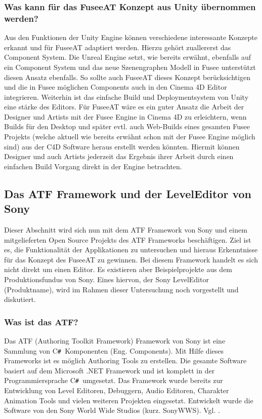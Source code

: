 \documentclass[pagesize, paper=a4, fontsize=12pt, titlepage=true, headings=small, headnosepline, abstractoff, liststotoc, nochapterprefix, plainheadsepline, twoside]{scrreprt}
\newcommand{\CSS}{C\texttt{\# }}
\begin{document}
\subsubsection{Was kann für das FuseeAT Konzept aus Unity übernommen werden?}
Aus den Funktionen der Unity Engine können verschiedene interessante Konzepte erkannt und für FuseeAT adaptiert werden. Hierzu gehört zuallererst das Component System. Die Unreal Engine setzt, wie bereits erwähnt, ebenfalls auf ein Component System und das neue Szenengraphen Modell in Fusee unterstützt diesen Ansatz ebenfalls. So sollte auch FuseeAT dieses Konzept berücksichtigen und die in Fusee möglichen Components auch in den Cinema 4D Editor integrieren. Weiterhin ist das einfache Build und Deploymentsystem von Unity eine stärke des Editors. Für FuseeAT wäre es ein guter Ansatz die Arbeit der Designer und Artists mit der Fusee Engine in Cinema 4D zu erleichtern, wenn Builds für den Desktop und später evtl. auch Web-Builds eines gesamten Fusee Projekts (welche aktuell wie bereits erwähnt schon mit der Fusee Engine möglich sind) aus der C4D Software heraus erstellt werden könnten. Hiermit können Designer und auch Artists jederzeit das Ergebnis ihrer Arbeit durch einen einfachen Build Vorgang direkt in der Engine betrachten.


\subsection{Das ATF Framework und der LevelEditor von Sony}
Dieser Abschnitt wird sich nun mit dem ATF Framework von Sony und einem mitgelieferten Open Source Projekts des ATF Frameworks beschäftigen. Ziel ist es, die Funktionalität der Applikationen zu untersuchen und hieraus Erkenntnisse für das Konzept des FuseeAT zu gewinnen. Bei diesem Framework handelt es sich nicht direkt um einen Editor. Es existieren aber Beispielprojekte aus dem Produktionsfundus von Sony. Eines hiervon, der Sony LevelEditor (Produktname), wird im Rahmen dieser Untersuchung noch vorgestellt und diskutiert.

\subsubsection{Was ist das ATF?}
Das ATF (Authoring Toolkit Framework) Framework von Sony ist eine Sammlung von \CSS Komponenten (Eng. Components). Mit Hilfe dieses Frameworks ist es möglich Authoring Tools zu erstellen. Die gesamte Software basiert auf dem Microsoft .NET Framework und ist komplett in der Programmiersprache \CSS umgesetzt. Das Framework wurde bereits zur Entwicklung von Level Editoren, Debuggern, Audio Editoren, Charakter Animation Tools und vielen weiteren Projekten eingesetzt. Entwickelt wurde die Software von den Sony World Wide Studios (kurz. SonyWWS). Vgl. .
\end{document}

